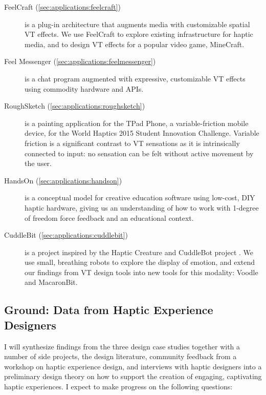 \begin{description}
	\item[FeelCraft (\autoref{sec:applications:feelcraft})] is a plug-in architecture that augments media with customizable spatial VT effects.
	We use FeelCraft to explore existing infrastructure for haptic media, and to design VT effects for a popular video game, MineCraft.
	
	\item[Feel Messenger (\autoref{sec:applications:feelmessenger})] is a chat program augmented with expressive, customizable VT effects using commodity hardware and APIs.
	
	\item[RoughSketch (\autoref{sec:applications:roughsketch})] is a painting application for the TPad Phone, a variable-friction mobile device, for the World Haptics 2015 Student Innovation Challenge. 
	Variable friction is a significant contrast to VT sensations as it is intrinsically connected to input: no sensation can be felt without active movement by the user.
	
	\item[HandsOn (\autoref{sec:applications:handson})] is a conceptual model for creative education software using low-cost, DIY haptic hardware, giving us an understanding of how to work with 1-degree of freedom force feedback and an educational context.

	\item[CuddleBit (\autoref{sec:applications:cuddlebit})] is a project inspired by the Haptic Creature \cite{Yohanan2011affectivetouch,Yohanan2011affectdisplay,Chang2010} and CuddleBot project \cite{Allen2015cuddlebot}.
	We use small, breathing robots to explore the display of emotion, and extend our findings from VT design tools into new tools for this modality: Voodle and MacaronBit.

\end{description}





\subsection{Ground: Data from Haptic Experience Designers}
I will synthesize findings from the three design case studies together with a number of side projects, the design literature, community feedback from a workshop on haptic experience design, and interviews with haptic designers into a preliminary design theory on how to support the creation of engaging, captivating haptic experiences.
I expect to make progress on the following questions:


